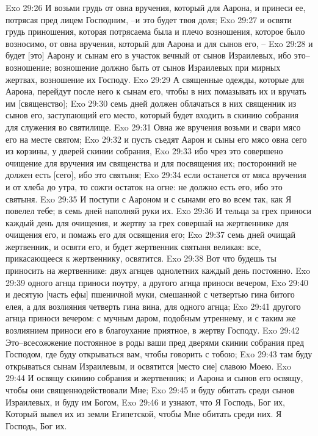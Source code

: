 Exo 29:26  И возьми грудь от овна вручения, который для Аарона, и принеси ее, потрясая пред лицем Господним, --и это будет твоя доля;
Exo 29:27  и освяти грудь приношения, которая потрясаема была и плечо возношения, которое было возносимо, от овна вручения, который для Аарона и для сынов его, --
Exo 29:28  и будет [это] Аарону и сынам его в участок вечный от сынов Израилевых, ибо это--возношение; возношение должно быть от сынов Израилевых при мирных жертвах, возношение их Господу.
Exo 29:29  А священные одежды, которые для Аарона, перейдут после него к сынам его, чтобы в них помазывать их и вручать им [священство];
Exo 29:30  семь дней должен облачаться в них священник из сынов его, заступающий его место, который будет входить в скинию собрания для служения во святилище.
Exo 29:31  Овна же вручения возьми и свари мясо его на месте святом;
Exo 29:32  и пусть съедят Аарон и сыны его мясо овна сего из корзины, у дверей скинии собрания,
Exo 29:33  ибо чрез это совершено очищение для вручения им священства и для посвящения их; посторонний не должен есть [сего], ибо это святыня;
Exo 29:34  если останется от мяса вручения и от хлеба до утра, то сожги остаток на огне: не должно есть его, ибо это святыня.
Exo 29:35  И поступи с Аароном и с сынами его во всем так, как Я повелел тебе; в семь дней наполняй руки их.
Exo 29:36  И тельца за грех приноси каждый день для очищения, и жертву за грех совершай на жертвеннике для очищения его, и помажь его для освящения его;
Exo 29:37  семь дней очищай жертвенник, и освяти его, и будет жертвенник святыня великая: все, прикасающееся к жертвеннику, освятится.
Exo 29:38  Вот что будешь ты приносить на жертвеннике: двух агнцев однолетних каждый день постоянно.
Exo 29:39  одного агнца приноси поутру, а другого агнца приноси вечером,
Exo 29:40  и десятую [часть ефы] пшеничной муки, смешанной с четвертью гина битого елея, а для возлияния четверть гина вина, для одного агнца;
Exo 29:41  другого агнца приноси вечером: с мучным даром, подобным утреннему, и с таким же возлиянием приноси его в благоухание приятное, в жертву Господу.
Exo 29:42  Это--всесожжение постоянное в роды ваши пред дверями скинии собрания пред Господом, где буду открываться вам, чтобы говорить с тобою;
Exo 29:43  там буду открываться сынам Израилевым, и освятится [место сие] славою Моею.
Exo 29:44  И освящу скинию собрания и жертвенник; и Аарона и сынов его освящу, чтобы они священнодействовали Мне;
Exo 29:45  и буду обитать среди сынов Израилевых, и буду им Богом,
Exo 29:46  и узнают, что Я Господь, Бог их, Который вывел их из земли Египетской, чтобы Мне обитать среди них. Я Господь, Бог их.
